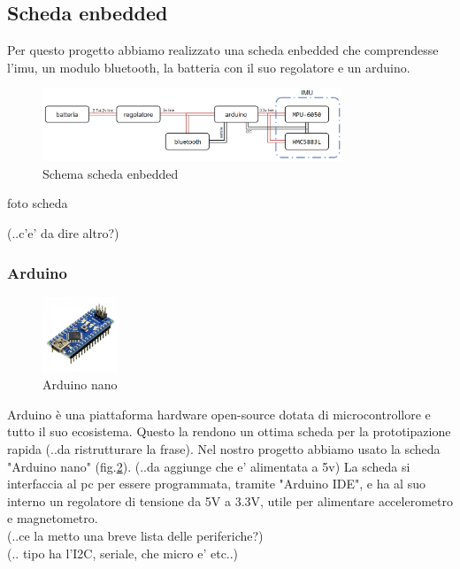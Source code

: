 \documentclass[10pt,a4paper]{article}
\begin{document}
\subsection{Scheda enbedded}
Per questo progetto abbiamo realizzato una scheda enbedded che comprendesse l'imu, un modulo bluetooth, la batteria con il suo regolatore e un arduino.

\begin{figure}[h]
	\centering
	\vspace{-10pt}
	\includegraphics[width=0.80\textwidth]{scheda.png}
	\vspace{-10pt}
	\caption{Schema scheda enbedded}
	\label{fig:scheda}
\end{figure}

foto scheda

(..c'e' da dire altro?)

\subsubsection{Arduino}

\begin{figure}
	\centering
	\vspace{-30pt}
	\includegraphics[width=0.2\textwidth]{arduino.jpg}
	\vspace{-30pt}
	\caption{Arduino nano}
	\label{fig:arduino_nano}
	\vspace{-30pt}
\end{figure}

Arduino \`e una piattaforma hardware open-source dotata di microcontrollore e tutto il suo ecosistema. Questo la rendono un ottima scheda per la prototipazione rapida (..da ristrutturare la frase). Nel nostro progetto abbiamo usato la scheda "Arduino nano" (fig.\ref{fig:arduino_nano}).
(..da aggiunge che e' alimentata a 5v)
La scheda si interfaccia al pc per essere programmata, tramite "Arduino IDE", e ha al suo interno un regolatore di tensione da 5V a 3.3V, utile per alimentare accelerometro e magnetometro.
\\
(..ce la metto una breve lista delle periferiche?)
\\
(.. tipo ha l'I2C, seriale, che micro e' etc..)
\end{document}
